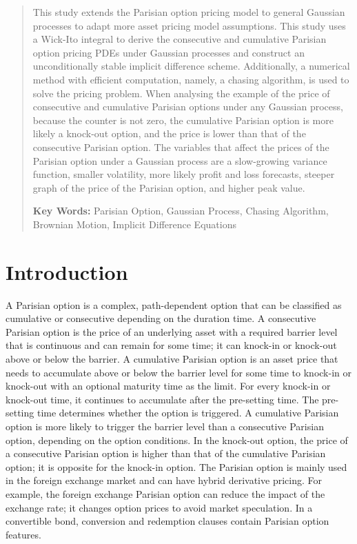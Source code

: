 \documentclass{ctexart} %
\begin{document}
\begin{abstract}
This study extends the Parisian option pricing model to general Gaussian processes to adapt more asset pricing model assumptions. This study uses a Wick-Ito integral to derive the consecutive and cumulative Parisian option pricing PDEs under Gaussian processes and construct an unconditionally stable implicit difference scheme. Additionally, a numerical method with efficient computation, namely, a chasing algorithm, is used to solve the pricing problem. When analysing the example of the price of consecutive and cumulative Parisian options under any Gaussian process, because the counter is not zero, the cumulative Parisian option is more likely a knock-out option, and the price is lower than that of the consecutive Parisian option. The variables that affect the prices of the Parisian option under a Gaussian process are a slow-growing variance function, smaller volatility, more likely profit and loss forecasts, steeper graph of the price of the Parisian option, and higher peak value.

{\bf Key Words: }Parisian Option, Gaussian Process, Chasing Algorithm, Brownian Motion, Implicit Difference Equations
\end{abstract}

\section{Introduction}
A Parisian option is a complex, path-dependent option that can be classified as cumulative or consecutive depending on the duration time. A consecutive Parisian option is the price of an underlying asset with a required barrier level that is continuous and can remain for some time; it can knock-in or knock-out above or below the barrier. A cumulative Parisian option is an asset price that needs to accumulate above or below the barrier level for some time to knock-in or knock-out with an optional maturity time as the limit. For every knock-in or knock-out time, it continues to accumulate after the pre-setting time. The pre-setting time determines whether the option is triggered. A cumulative Parisian option is more likely to trigger the barrier level than a consecutive Parisian option, depending on the option conditions. In the knock-out option, the price of a consecutive Parisian option is higher than that of the cumulative Parisian option; it is opposite for the knock-in option. The Parisian option is mainly used in the foreign exchange market and can have hybrid derivative pricing. For example, the foreign exchange Parisian option can reduce the impact of the exchange rate; it changes option prices to avoid market speculation. In a convertible bond, conversion and redemption clauses contain Parisian option features.
\end{document}
